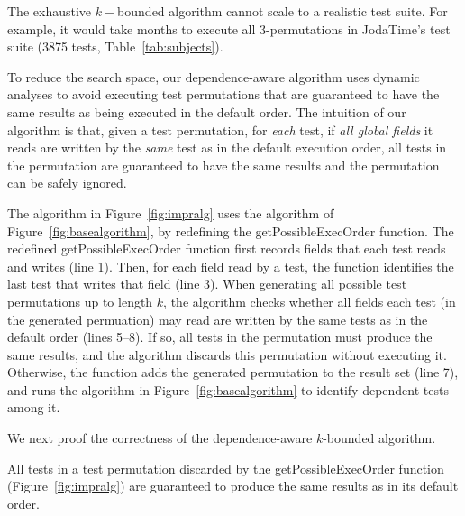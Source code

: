 The exhaustive $k-$bounded algorithm cannot scale to a realistic test suite.
For example, it would take months to 
execute all 3-permutations
in JodaTime's test suite (3875 tests, Table~\ref{tab:subjects}).

To reduce the search space, our dependence-aware algorithm
uses dynamic analyses to avoid executing test
permutations that are guaranteed to have the
same results as being executed in the default order.
The intuition of our algorithm is that,
given a test permutation, for \textit{each}
test, if \textit{all global fields} it reads
are written by the \textit{same} test as
in the default execution order, all tests in
the permutation are guaranteed to
have the same results and the permutation can be safely ignored. 

The algorithm in Figure~\ref{fig:impralg} uses the
algorithm of Figure~\ref{fig:basealgorithm}, by redefining
the getPossibleExecOrder function. The redefined
getPossibleExecOrder function first records
fields that each test reads and writes (line 1).
Then, for each field read by a test,
the function identifies the last test that writes
that field (line 3).
When generating all possible test permutations
up to length $k$, the algorithm checks whether
all fields each test (in the generated permuation)
may read are written by the same tests as in the
default order (lines 5--8). If so, all tests in the permutation
must produce the same results, and the algorithm discards
this permutation without executing it. Otherwise,
the function adds the generated permutation to the result
set (line 7), and runs the algorithm in Figure~\ref{fig:basealgorithm}
to identify dependent tests among it.


We next proof the correctness of the dependence-aware
$k$-bounded algorithm.

\begin{theorem}
All tests in a test permutation discarded by the getPossibleExecOrder
function (Figure~\ref{fig:impralg}) are guaranteed to produce the same results as in its default order.
\end{theorem}

